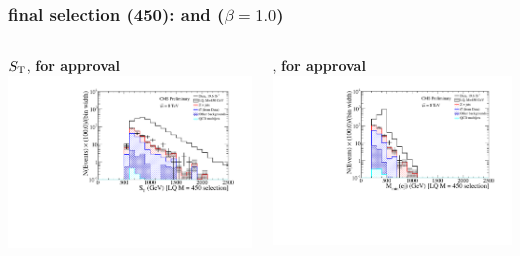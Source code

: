 \documentclass[bigger]{beamer}
\providecommand{\alert}[1]{\textbf{#1}}
\begin{document}
\begin{frame}
\frametitle{\eejj final selection (450): \ST and \mejmin ($\beta = 1.0$)}
\label{sec-2-4-2}
\begin{columns}
\begin{column}{0.6\textwidth}
\label{sec-2-4-2-1}

\centering
$S_{\text{T}}$, \alert{for approval}
\includegraphics[width=\textwidth]{fig/ee/finalSelection/sT_eejj_LQ450_eejj.pdf}
\end{column}
\begin{column}{0.6\textwidth}
\label{sec-2-4-2-2}

\centering
\mejmin, \alert{for approval}
\includegraphics[width=\textwidth]{fig/ee/finalSelection/Mej_selected_min_LQ450_eejj.pdf}
\end{column}
\end{columns}
\end{frame}
\end{document}
